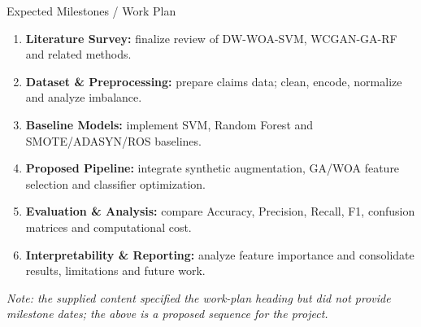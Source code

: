 \documentclass[aspectratio=169,11pt]{beamer}
\begin{document}
\begin{frame}{Expected Milestones / Work Plan}
\begin{enumerate}
\item \textbf{Literature Survey:} finalize review of DW-WOA-SVM, WCGAN-GA-RF and related methods.
\item \textbf{Dataset \& Preprocessing:} prepare claims data; clean, encode, normalize and analyze imbalance.
\item \textbf{Baseline Models:} implement SVM, Random Forest and SMOTE/ADASYN/ROS baselines.
\item \textbf{Proposed Pipeline:} integrate synthetic augmentation, GA/WOA feature selection and classifier optimization.
\item \textbf{Evaluation \& Analysis:} compare Accuracy, Precision, Recall, F1, confusion matrices and computational cost.
\item \textbf{Interpretability \& Reporting:} analyze feature importance and consolidate results, limitations and future work.
\end{enumerate}
\vspace{2mm}
{\scriptsize\textit{Note: the supplied content specified the work-plan heading but did not provide milestone dates; the above is a proposed sequence for the project.}}
\end{frame}
\end{document}
